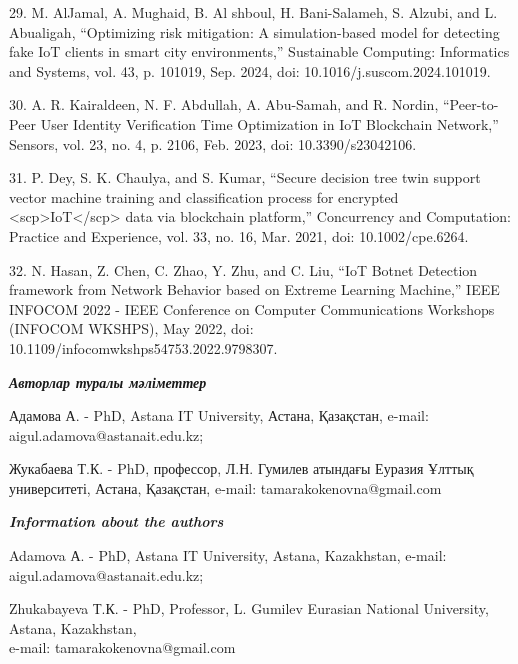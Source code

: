 \begin{noparindent}
29. M. AlJamal, A. Mughaid, B. Al shboul, H. Bani-Salameh, S. Alzubi,
and L. Abualigah, ``Optimizing risk mitigation: A simulation-based model
for detecting fake IoT clients in smart city environments,'' Sustainable
Computing: Informatics and Systems, vol. 43, p. 101019, Sep. 2024, doi:
10.1016/j.suscom.2024.101019.

30. A. R. Kairaldeen, N. F. Abdullah, A. Abu-Samah, and R. Nordin,
``Peer-to-Peer User Identity Verification Time Optimization in IoT
Blockchain Network,'' Sensors, vol. 23, no. 4, p. 2106, Feb. 2023, doi:
10.3390/s23042106.

31. P. Dey, S. K. Chaulya, and S. Kumar, ``Secure decision tree twin
support vector machine training and classification process for encrypted
\textless scp\textgreater IoT\textless/scp\textgreater{} data via
blockchain platform,'' Concurrency and Computation: Practice and
Experience, vol. 33, no. 16, Mar. 2021, doi: 10.1002/cpe.6264.

32. N. Hasan, Z. Chen, C. Zhao, Y. Zhu, and C. Liu, ``IoT Botnet
Detection framework from Network Behavior based on Extreme Learning
Machine,'' IEEE INFOCOM 2022 - IEEE Conference on Computer
Communications Workshops (INFOCOM WKSHPS), May 2022, doi:
10.1109/infocomwkshps54753.2022.9798307.
\end{noparindent}

\emph{{\bfseries Авторлар туралы мәліметтер}}
\begin{noparindent}

Адамова А. - PhD, Astana IT University, Астана, Қазақстан, e-mail:
aigul.adamova@astanait.edu.kz;

Жукабаева Т.К. - PhD, профессор, Л.Н. Гумилев атындағы Еуразия Ұлттық
университеті, Астана, Қазақстан, e-mail: tamarakokenovna@gmail.com
\end{noparindent}

\emph{{\bfseries Information about the authors}}
\begin{noparindent}

Adamova А. - PhD, Astana IT University, Astana, Kazakhstan, e-mail:
aigul.adamova@astanait.edu.kz;

Zhukabayeva Т.К. - PhD, Professor, L. Gumilev Eurasian National
University, Astana, Kazakhstan,\\e-mail: tamarakokenovna@gmail.com
\end{noparindent}





